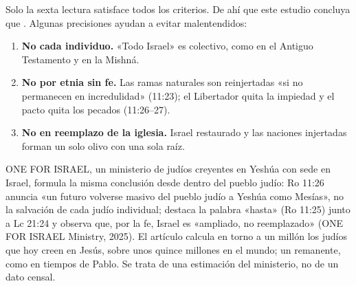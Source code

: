 Solo la sexta lectura satisface todos los criterios. De ahí que este estudio concluya que . Algunas precisiones ayudan a evitar malentendidos:
\begin{enumerate}
\item \textbf{No cada individuo.} «Todo Israel» es colectivo, como en el Antiguo Testamento y en la Mishná.
\item \textbf{No por etnia sin fe.} Las ramas naturales son reinjertadas «si no permanecen en incredulidad» (11:23); el Libertador quita la impiedad y el pacto quita los pecados (11:26--27).
\item \textbf{No en reemplazo de la iglesia.} Israel restaurado y las naciones injertadas forman un solo olivo con una sola raíz.
\end{enumerate}

ONE FOR ISRAEL, un ministerio de judíos creyentes en Yeshúa con sede en Israel, formula la misma conclusión desde dentro del pueblo judío: Ro 11:26 anuncia «un futuro volverse masivo del pueblo judío a Yeshúa como Mesías», no la salvación de cada judío individual; destaca la palabra «hasta» (Ro 11:25) junto a Lc 21:24 y observa que, por la fe, Israel es «ampliado, no reemplazado» (ONE FOR ISRAEL Ministry, 2025). El artículo calcula en torno a un millón los judíos que hoy creen en Jesús, sobre unos quince millones en el mundo; un remanente, como en tiempos de Pablo. Se trata de una estimación del ministerio, no de un dato censal.

